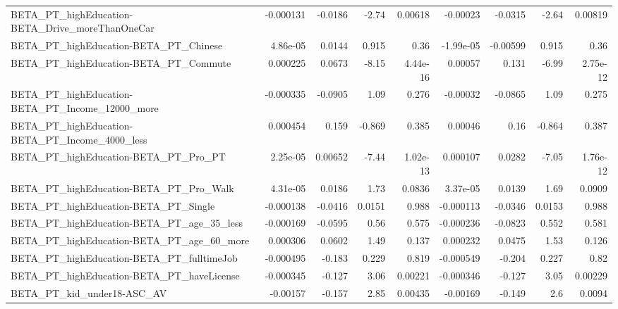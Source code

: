 \begin{tabular}{lrrrrrrrr}
BETA\_PT\_highEducation-BETA\_Drive\_moreThanOneCar    &   -0.000131 &      -0.0186 &     -2.74 &  0.00618 &   -0.00023 &     -0.0315 &        -2.64 &       0.00819 \\
BETA\_PT\_highEducation-BETA\_PT\_Chinese              &    4.86e-05 &       0.0144 &     0.915 &     0.36 &  -1.99e-05 &    -0.00599 &        0.915 &          0.36 \\
BETA\_PT\_highEducation-BETA\_PT\_Commute              &    0.000225 &       0.0673 &     -8.15 & 4.44e-16 &    0.00057 &       0.131 &        -6.99 &      2.75e-12 \\
BETA\_PT\_highEducation-BETA\_PT\_Income\_12000\_more    &   -0.000335 &      -0.0905 &      1.09 &    0.276 &   -0.00032 &     -0.0865 &         1.09 &         0.275 \\
BETA\_PT\_highEducation-BETA\_PT\_Income\_4000\_less     &    0.000454 &        0.159 &    -0.869 &    0.385 &    0.00046 &        0.16 &       -0.864 &         0.387 \\
BETA\_PT\_highEducation-BETA\_PT\_Pro\_PT               &    2.25e-05 &      0.00652 &     -7.44 & 1.02e-13 &   0.000107 &      0.0282 &        -7.05 &      1.76e-12 \\
BETA\_PT\_highEducation-BETA\_PT\_Pro\_Walk             &    4.31e-05 &       0.0186 &      1.73 &   0.0836 &   3.37e-05 &      0.0139 &         1.69 &        0.0909 \\
BETA\_PT\_highEducation-BETA\_PT\_Single               &   -0.000138 &      -0.0416 &    0.0151 &    0.988 &  -0.000113 &     -0.0346 &       0.0153 &         0.988 \\
BETA\_PT\_highEducation-BETA\_PT\_age\_35\_less          &   -0.000169 &      -0.0595 &      0.56 &    0.575 &  -0.000236 &     -0.0823 &        0.552 &         0.581 \\
BETA\_PT\_highEducation-BETA\_PT\_age\_60\_more          &    0.000306 &       0.0602 &      1.49 &    0.137 &   0.000232 &      0.0475 &         1.53 &         0.126 \\
BETA\_PT\_highEducation-BETA\_PT\_fulltimeJob          &   -0.000495 &       -0.183 &     0.229 &    0.819 &  -0.000549 &      -0.204 &        0.227 &          0.82 \\
BETA\_PT\_highEducation-BETA\_PT\_haveLicense          &   -0.000345 &       -0.127 &      3.06 &  0.00221 &  -0.000346 &      -0.127 &         3.05 &       0.00229 \\
BETA\_PT\_kid\_under18-ASC\_AV                         &    -0.00157 &       -0.157 &      2.85 &  0.00435 &   -0.00169 &      -0.149 &          2.6 &        0.0094 \\

\end{tabular}
